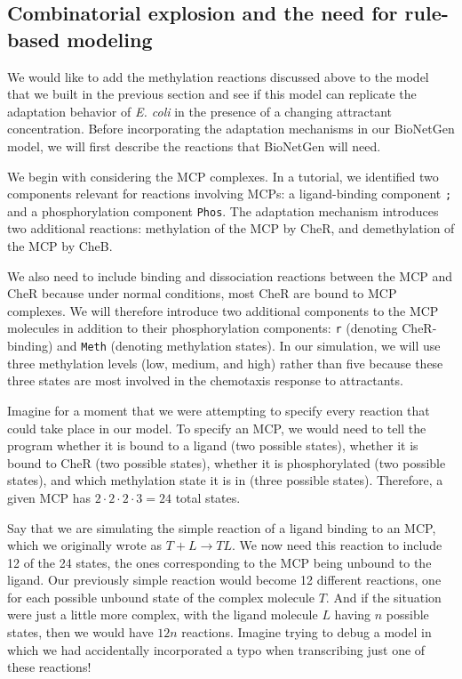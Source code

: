 \FloatBarrier
{}
\subsection{Combinatorial explosion and the need for rule-based modeling}

We would like to add the methylation reactions discussed above to the model that we built in the previous section and see if this model can replicate the adaptation behavior of \textit{E. coli} in the presence of a changing attractant concentration. Before incorporating the adaptation mechanisms in our BioNetGen model, we will first describe the reactions that BioNetGen will need.

We begin with considering the MCP complexes. In a tutorial,  we identified two components relevant for reactions involving MCPs: a ligand-binding component \texttt{;} and a phosphorylation component \texttt{Phos}. The adaptation mechanism introduces two additional reactions: methylation of the MCP by CheR, and demethylation of the MCP by CheB.

We also need to include binding and dissociation reactions between the MCP and CheR because under normal conditions, most CheR are bound to MCP complexes. We will therefore introduce two additional components to the MCP molecules in addition to their phosphorylation components: \texttt{r} (denoting CheR-binding) and \texttt{Meth} (denoting methylation states). In our simulation, we will use three methylation levels (low, medium, and high) rather than five because these three states are most involved in the chemotaxis response to attractants.

Imagine for a moment that we were attempting to specify every reaction that could take place in our model. To specify an MCP, we would need to tell the program whether it is bound to a ligand (two possible states), whether it is bound to CheR (two possible states), whether it is phosphorylated (two possible states), and which methylation state it is in (three possible states). Therefore, a given MCP has $2 \cdot 2 \cdot 2 \cdot 3 = 24$ total states.

Say that we are simulating the simple reaction of a ligand binding to an MCP, which we originally wrote as $T + L \rightarrow TL$. We now need this reaction to include 12 of the 24 states, the ones corresponding to the MCP being unbound to the ligand. Our previously simple reaction would become 12 different reactions, one for each possible unbound state of the complex molecule $T$. And if the situation were just a little more complex, with the ligand molecule $L$ having $n$ possible states, then we would have $12n$ reactions. Imagine trying to debug a model in which we had accidentally incorporated a typo when transcribing just one of these reactions!

